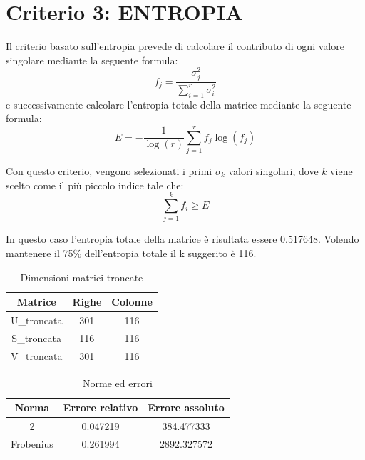 \section{Criterio 3: ENTROPIA}

Il criterio basato sull'entropia prevede di calcolare il contributo di ogni valore singolare mediante la seguente formula:
\begin{equation}
    f_j=\frac{\sigma_j^2}{\sum_{i=1}^{r}\sigma_i^2}
    \label{fj:contributi}
\end{equation}
e successivamente calcolare l'entropia totale della matrice mediante la seguente formula:
\begin{equation}
    E = -\frac{1}{\log(r)}\sum_{j=1}^r f_j \log(f_j)
\end{equation}

\noindent Con questo criterio, vengono selezionati i primi $\sigma_k$ valori singolari, dove $k$ viene scelto come il più piccolo indice tale che:
\begin{equation}
\sum_{j=1}^k f_i \geq E
\end{equation}

In questo caso l'entropia totale della matrice è risultata essere 0.517648. Volendo mantenere il 75\% dell'entropia totale il k suggerito è 116.
\begin{table}[H]
    \centering
    \begin{tabular}{|c|c|c|}
        \hline
        \textbf{Matrice} & \textbf{Righe} & \textbf{Colonne} \\
        \hline
        U\_troncata & 301 & 116 \\
        \hline
        S\_troncata & 116 & 116 \\
        \hline
        V\_troncata & 301 & 116 \\
        \hline
    \end{tabular}
    \caption{Dimensioni matrici troncate}
\end{table}

\begin{table}[H]
    \centering
    \begin{tabular}{|c|c|c|}
        \hline
        \textbf{Norma} & \textbf{Errore relativo} & \textbf{Errore assoluto} \\
        \hline
        2 & 0.047219 & 384.477333 \\
        \hline
        Frobenius & 0.261994 & 2892.327572 \\
        \hline
    \end{tabular}
    \caption{Norme ed errori}
\end{table}

